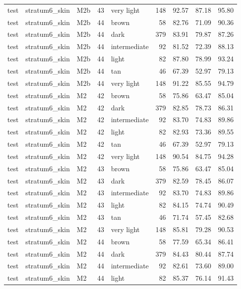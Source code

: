 \begin{tabular}{lllrlrrrr}
test & stratum6\_skin & M2b & 43 & very light & 148 & 92.57 & 87.18 & 95.80 \\
test & stratum6\_skin & M2b & 44 & brown & 58 & 82.76 & 71.09 & 90.36 \\
test & stratum6\_skin & M2b & 44 & dark & 379 & 83.91 & 79.87 & 87.26 \\
test & stratum6\_skin & M2b & 44 & intermediate & 92 & 81.52 & 72.39 & 88.13 \\
test & stratum6\_skin & M2b & 44 & light & 82 & 87.80 & 78.99 & 93.24 \\
test & stratum6\_skin & M2b & 44 & tan & 46 & 67.39 & 52.97 & 79.13 \\
test & stratum6\_skin & M2b & 44 & very light & 148 & 91.22 & 85.55 & 94.79 \\
test & stratum6\_skin & M2 & 42 & brown & 58 & 75.86 & 63.47 & 85.04 \\
test & stratum6\_skin & M2 & 42 & dark & 379 & 82.85 & 78.73 & 86.31 \\
test & stratum6\_skin & M2 & 42 & intermediate & 92 & 83.70 & 74.83 & 89.86 \\
test & stratum6\_skin & M2 & 42 & light & 82 & 82.93 & 73.36 & 89.55 \\
test & stratum6\_skin & M2 & 42 & tan & 46 & 67.39 & 52.97 & 79.13 \\
test & stratum6\_skin & M2 & 42 & very light & 148 & 90.54 & 84.75 & 94.28 \\
test & stratum6\_skin & M2 & 43 & brown & 58 & 75.86 & 63.47 & 85.04 \\
test & stratum6\_skin & M2 & 43 & dark & 379 & 82.59 & 78.45 & 86.07 \\
test & stratum6\_skin & M2 & 43 & intermediate & 92 & 83.70 & 74.83 & 89.86 \\
test & stratum6\_skin & M2 & 43 & light & 82 & 84.15 & 74.74 & 90.49 \\
test & stratum6\_skin & M2 & 43 & tan & 46 & 71.74 & 57.45 & 82.68 \\
test & stratum6\_skin & M2 & 43 & very light & 148 & 85.81 & 79.28 & 90.53 \\
test & stratum6\_skin & M2 & 44 & brown & 58 & 77.59 & 65.34 & 86.41 \\
test & stratum6\_skin & M2 & 44 & dark & 379 & 84.43 & 80.44 & 87.74 \\
test & stratum6\_skin & M2 & 44 & intermediate & 92 & 82.61 & 73.60 & 89.00 \\
test & stratum6\_skin & M2 & 44 & light & 82 & 85.37 & 76.14 & 91.43 \\

\end{tabular}
